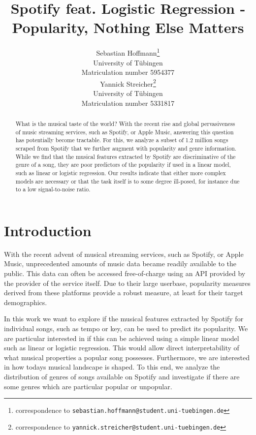 \documentclass{article}
\title{Spotify feat. Logistic Regression - \\ Popularity, Nothing Else Matters}
\author{%
  Sebastian Hoffmann\thanks{correspondence to \texttt{sebastian.hoffmann@student.uni-tuebingen.de}}\\
  University of Tübingen\\
  Matriculation number 5954377\\
  \And
  Yannick Streicher\thanks{correspondence to \texttt{yannick.streicher@student.uni-tuebingen.de}}\\
  University of Tübingen\\
  Matriculation number 5331817\\
}
\begin{document}
\maketitle

\begin{abstract}
  What is the musical taste of the world? With the recent rise and global pervasiveness of music streaming services, such as Spotify, or Apple Music, answering this question has potentially become tractable. For this, we analyze a subset of 1.2 million songs scraped from Spotify that we further augment with popularity and genre information. While we find that the musical features extracted by Spotify are discriminative of the genre of a song, they are poor predictors of the popularity if used in a linear model, such as linear or logistic regression. Our results indicate that either more complex models are necessary or that the task itself is to some degree ill-posed, for instance due to a low signal-to-noise ratio.
\end{abstract}

\section{Introduction}
%
%
With the recent advent of musical streaming services, such as Spotify, or Apple Music, unprecedented amounts of music data became readily available to the public. This data can often be accessed free-of-charge using an API provided by the provider of the service itself. Due to their large userbase, popularity measures derived from these platforms provide a robust measure, at least for their target demographics.

In this work we want to explore if the musical features extracted by Spotify for individual songs, such as tempo or key, can be used to predict  its popularity. We are particular interested in if this can be achieved using a simple linear model such as linear or logistic regression. This would allow direct interpretability of what musical properties a popular song possesses.
%
Furthermore, we are interested in how todays musical landscape is shaped. To this end, we analyze the distribution of genres of songs available on Spotify and investigate if there are some genres which are particular popular or unpopular.
\end{document}
